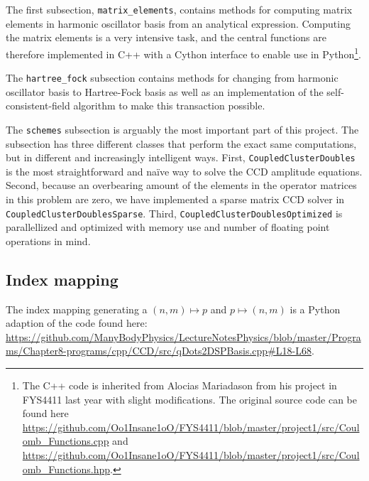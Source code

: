 \documentclass[
    a4paper, aps, twocolumn, floatfix, superscriptaddress,
    nofootinbib]{revtex4-1}
\newcommand{\1}{\mathds{1}}
\begin{document}
        \vspace{10pt}
        \vspace{10pt}

        The first subsection, \texttt{matrix\_elements},
        contains methods for computing matrix elements in harmonic
        oscillator basis from an analytical
        expression\cite{anisimovas1998energy}.  Computing the matrix
        elements is a very intensive task, and the central functions are
        therefore implemented in C++ with a Cython interface to enable use in
        Python\footnote{The C++ code is inherited from Alocias Mariadason from
        his project in FYS4411 last year with slight modifications. The original
        source code can be found here
        \url{https://github.com/Oo1Insane1oO/FYS4411/blob/master/project1/src/Coulomb_Functions.cpp}
        and
        \url{https://github.com/Oo1Insane1oO/FYS4411/blob/master/project1/src/Coulomb_Functions.hpp}.
        }.

        The \texttt{hartree\_fock} subsection contains methods
        for changing from harmonic oscillator basis to Hartree-Fock basis as
        well as an implementation of the self-consistent-field algorithm to
        make this transaction possible.

        The \texttt{schemes} subsection is arguably the most important
        part of this project. The subsection has three different classes that
        perform the exact same computations, but in different and increasingly
        intelligent ways. First, \texttt{CoupledClusterDoubles} is
        the most straightforward and naïve way to solve the CCD amplitude
        equations.  Second, because an overbearing amount of the elements in the
        operator matrices in this problem are zero, we have implemented a sparse
        matrix CCD solver in \texttt{CoupledClusterDoublesSparse}.
        Third, \texttt{CoupledClusterDoublesOptimized} is
        parallellized and optimized with memory use and number of floating point
        operations in mind.

    \subsection{Index mapping}
        The index mapping generating a $(n, m) \mapsto p$ and $p \mapsto (n, m)$
        is a Python adaption of the code found here:
        \url{https://github.com/ManyBodyPhysics/LectureNotesPhysics/blob/master/Programs/Chapter8-programs/cpp/CCD/src/qDots2DSPBasis.cpp#L18-L68}.
\end{document}
